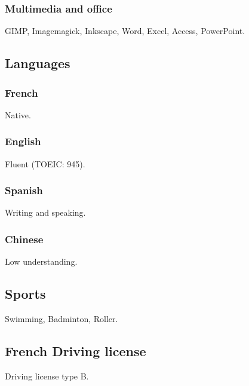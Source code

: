 \documentclass{article}
\begin{document}
\begin{multicols}{2}
                \subsubsection{Multimedia and office}
                    GIMP, Imagemagick, Inkscape, Word, Excel, Access, PowerPoint.
            \subsection{Languages}
                \subsubsection{French}
                    Native.
                \subsubsection{English}
                    Fluent (TOEIC: 945).
                \subsubsection{Spanish}
                    Writing and speaking.
                \subsubsection{Chinese}
                    Low understanding.
                \subsection{Sports}
                    Swimming, Badminton, Roller.
                \subsection{French Driving license}
                    Driving license type B.
    \end{multicols}
\end{document}
